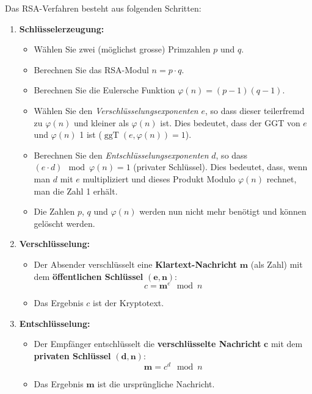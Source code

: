 \begin{myprocedure}\label{myprocedure:RSA}
	Das \gls{RSA}-Verfahren besteht aus folgenden Schritten:
\begin{enumerate}
	\item \textbf{Schlüsselerzeugung:}
	      \begin{itemize}
		      \item Wählen Sie zwei (möglichst grosse) Primzahlen \( p \) und \( q \).
		      \item Berechnen Sie das \gls{RSA}-Modul \( n = p \cdot q \).
		      \item Berechnen Sie die Eulersche Funktion \( \varphi(n) = (p-1)(q-1) \).
		      \item Wählen Sie den \emph{Verschlüsselungsexponenten} \( e \), so dass dieser teilerfremd zu \( \varphi(n) \) und kleiner als $\varphi(n)$ ist. Dies bedeutet, dass der \gls{GGT} von $e$ und $\varphi(n)$ 1 ist ($\operatorname{ggT}(e, \varphi(n)) = 1$).
		      \item Berechnen Sie den \emph{Entschlüsselungsexponenten} \( d \), so dass \( (e \cdot d) \mod \varphi(n) = 1  \) (privater Schlüssel). Dies bedeutet, dass, wenn man $d$ mit $e$ multipliziert und dieses Produkt Modulo $\varphi(n)$ rechnet, man die Zahl 1 erhält.
		      \item Die Zahlen $p$, $q$ und $\varphi(n)$ werden nun nicht mehr benötigt und können gelöscht werden.
	      \end{itemize}
	\item \textbf{Verschlüsselung:}
	      \begin{itemize}
		      \item Der Absender verschlüsselt eine \textbf{Klartext-Nachricht} \( \mathbf{m} \) (als Zahl) mit dem \textbf{öffentlichen Schlüssel} \( \mathbf{(e, n)} \):
		            \[
			            c = \mathbf{m}^e \mod n
		            \]
		      \item Das Ergebnis \( c \) ist der Kryptotext.
	      \end{itemize}
	\item \textbf{Entschlüsselung:}
	      \begin{itemize}
		      \item Der Empfänger entschlüsselt die \textbf{verschlüsselte Nachricht} \( \mathbf{c} \) mit dem \textbf{privaten Schlüssel} \( \mathbf{(d, n)} \):
		            \[
			            \mathbf{m} = c^d \mod n
		            \]
		      \item Das Ergebnis \( \mathbf{m} \) ist die ursprüngliche Nachricht.
	      \end{itemize}
\end{enumerate}
\end{myprocedure}


